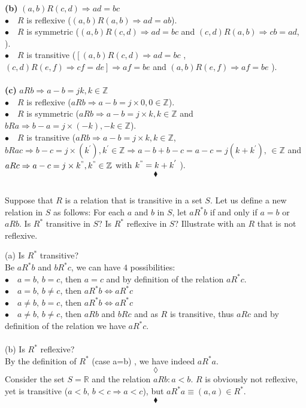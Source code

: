 \textbf{(b)} $(a,b)R(c,d) \Rightarrow ad=bc$\\
$\bullet\quad R$ is reflexive ($(a,b)R(a,b) \Rightarrow ad=ab$).\\
$\bullet\quad R$ is symmetric ($(a,b)R(c,d) \Rightarrow ad=bc$ and  $(c,d)R(a,b) \Rightarrow cb=ad$, ).\\
$\bullet\quad R$ is transitive ($\left[(a,b)R(c,d) \Rightarrow ad=bc\right.$ ,   $\left.(c,d)R(e,f) \Rightarrow cf=de\right] \Rightarrow af=be$  and  $(a,b)R(e,f) \Rightarrow af=be$ ).\\\\

\textbf{(c)} $aRb \Rightarrow a-b=jk, k\in \mathbb{Z}$\\
$\bullet\quad R$ is reflexive ($aRb \Rightarrow a-b=j\times 0, 0\in \mathbb{Z}$).\\
$\bullet\quad R$ is symmetric ($aRb \Rightarrow a-b=j\times k, k\in \mathbb{Z}$ and $bRa \Rightarrow b-a=j\times (-k), -k\in \mathbb{Z}$).\\
$\bullet\quad R$ is transitive ($aRb \Rightarrow a-b=j\times k, k\in \mathbb{Z}$,  $bRac \Rightarrow b-c=j\times (k^{'}), k^{'}\in \mathbb{Z} \Rightarrow a-b+b-c= a-c = j( k+k^{'}),\, \in \mathbb{Z}$ and $aRc \Rightarrow a-c=j\times k^{"}, k^{"}\in \mathbb{Z}$ with $ k^{"}= k+k^{'}$ ).
$$\blacklozenge$$


\subsection{}
\begin{tcolorbox}
Suppose that $R$ is a relation that is transitive in a set $S$. Let us define a new relation in $S$ as follows: For each $a$ and $b$ in $S$, let $a R^{*}b$ if and only if $a=b$ or $a R b$. Is  $R^{*}$ transitive in $S$? Is $R^{*}$ reflexive in $S$? Illustrate with an $R$ that is not reflexive. 
\end{tcolorbox}
$$ $$
(a) Is $R^*$ transitive?\\
Be $aR^* b$ and $bR^* c$, we can have $4$ possibilities: \\
$\bullet\quad a=b,\, b=c$, then $a=c$ and by definition of the relation $aR^* c$.\\
$\bullet\quad a=b,\, b\neq c$, then $aR^* b\Leftrightarrow aR^* c$\\
$\bullet\quad a\neq b,\, b= c$, then $aR^* b\Leftrightarrow aR^* c$\\
$\bullet\quad a\neq b,\, b\neq c$, then $aR b$ and $  bR c$ and as $R$ is transitive, thus $aR c$ and by definition of the relation we have $aR^* c$.\\\\
(b) Is $R^*$ reflexive?\\
By the definition of $R^*$ (case a=b) , we have indeed $aR^* a$.
$$\lozenge$$
Consider the set $S= \mathbb{R}$ and the relation $aRb: a<b$. $R$ is obviously not reflexive, yet is transitive ($a<b,\, b<c\Rightarrow a<c$), but  $aR^* a\equiv (a,a)\in R^*$.
$$\blacklozenge$$

